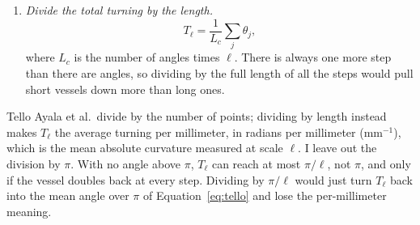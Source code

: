 \begin{enumerate}
\begin{align*}
    \end{align*}
    Every other turn falls in between, with part of the step going forward and part going off to the side, and $\operatorname{atan2}$ converts that split into an angle.
    Figure~\ref{fig:turning-angle-3d} shows a turn in 3D with $\ell = 5$\,mm.
    The vessel comes in flat along $a_j = (4,3,0)$ and leaves along $b_j = (4,0,3)$, climbing 3\,mm in $z$:
    \begin{gather*}
      a_j \cdot b_j = 16, \qquad
      a_j \times b_j = (9, -12, -12), \qquad
      \lvert a_j \times b_j\rvert = \sqrt{369} = 19.21, \\
      \theta_j = \operatorname{atan2}(19.21, 16) = 50.2^\circ.
    \end{gather*}
    Put simply, 3.2\,mm of the 5\,mm step still goes forward and 3.84\,mm goes off to the side.
    Seen from above, the second step looks like $b_j' = (4,0,0)$ and the turn like only $\operatorname{atan2}(12, 16) = 36.9^\circ$ (gray arc), so this view hides $13.3^\circ$ of the bend.
    $\operatorname{atan2}$ gives the same answer as the arccosine in Equation~\eqref{eq:turn}, but copes better when the vessel is nearly straight.
    There the cosine sits so close to 1 that small turns hardly change it, and the arccosine struggles to tell them apart.
    On a flat 2D image every bend is seen from the same side, so each turn goes either left or right and carries a sign; the $\lvert\theta_i\rvert$ in Equation~\eqref{eq:tello} throws that sign away.
    In 3D each bend lies in a plane of its own, with no shared side to look from, so left and right lose their meaning.
    $\theta_j$ is therefore always between $0^\circ$ and $180^\circ$, and Equation~\eqref{eq:tortuosity-3d} needs no absolute value.
  \item \emph{Divide the total turning by the length.}
    \begin{equation}
      T_\ell = \frac{1}{L_c}\sum_j \theta_j ,
      \label{eq:tortuosity-3d}
    \end{equation}
    where $L_c$ is the number of angles times $\ell$.
    There is always one more step than there are angles, so dividing by the full length of all the steps would pull short vessels down more than long ones.
\end{enumerate}
Tello Ayala et al.\ divide by the number of points; dividing by length instead makes $T_\ell$ the average turning per millimeter, in radians per millimeter (mm$^{-1}$), which is the mean absolute curvature measured at scale $\ell$.
I leave out the division by $\pi$.
With no angle above $\pi$, $T_\ell$ can reach at most $\pi/\ell$, not $\pi$, and only if the vessel doubles back at every step.
Dividing by $\pi/\ell$ would just turn $T_\ell$ back into the mean angle over $\pi$ of Equation~\eqref{eq:tello} and lose the per-millimeter meaning.


